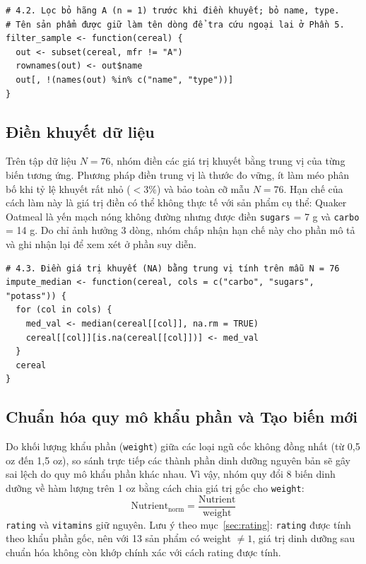 \documentclass[12pt,a4paper]{article}
\begin{document}
\begin{lstlisting}
# 4.2. Lọc bỏ hãng A (n = 1) trước khi điền khuyết; bỏ name, type.
# Tên sản phẩm được giữ làm tên dòng để tra cứu ngoại lai ở Phần 5.
filter_sample <- function(cereal) {
  out <- subset(cereal, mfr != "A")
  rownames(out) <- out$name
  out[, !(names(out) %in% c("name", "type"))]
}
\end{lstlisting}

\subsection{Điền khuyết dữ liệu}

Trên tập dữ liệu $N = 76$, nhóm điền các giá trị khuyết bằng trung vị của từng biến tương ứng.
Phương pháp điền trung vị là thước đo vững, ít làm méo phân bố khi tỷ lệ khuyết rất nhỏ
($< 3\%$) và bảo toàn cỡ mẫu $N = 76$. Hạn chế của cách làm này là giá trị điền có thể không
thực tế với sản phẩm cụ thể: Quaker Oatmeal là yến mạch nóng không đường nhưng được điền
\texttt{sugars} = 7 g và \texttt{carbo} = 14 g. Do chỉ ảnh hưởng 3 dòng, nhóm chấp nhận hạn chế
này cho phần mô tả và ghi nhận lại để xem xét ở phần suy diễn.

\begin{lstlisting}
# 4.3. Điền giá trị khuyết (NA) bằng trung vị tính trên mẫu N = 76
impute_median <- function(cereal, cols = c("carbo", "sugars", "potass")) {
  for (col in cols) {
    med_val <- median(cereal[[col]], na.rm = TRUE)
    cereal[[col]][is.na(cereal[[col]])] <- med_val
  }
  cereal
}
\end{lstlisting}

\subsection{Chuẩn hóa quy mô khẩu phần và Tạo biến mới}

Do khối lượng khẩu phần (\texttt{weight}) giữa các loại ngũ cốc không đồng nhất (từ 0,5 oz
đến 1,5 oz), so sánh trực tiếp các thành phần dinh dưỡng nguyên bản sẽ gây sai lệch do quy mô
khẩu phần khác nhau. Vì vậy, nhóm quy đổi 8 biến dinh dưỡng về hàm lượng trên 1 oz
bằng cách chia giá trị gốc cho \texttt{weight}:
\begin{equation}
\text{Nutrient}_{\text{norm}} = \frac{\text{Nutrient}}{\text{weight}}
\end{equation}
\texttt{rating} và \texttt{vitamins} giữ nguyên. Lưu ý theo mục~\ref{sec:rating}:
\texttt{rating} được tính theo khẩu phần gốc, nên với 13 sản phẩm có weight $\neq 1$, giá
trị dinh dưỡng sau chuẩn hóa không còn khớp chính xác với cách rating được tính.
\end{document}
